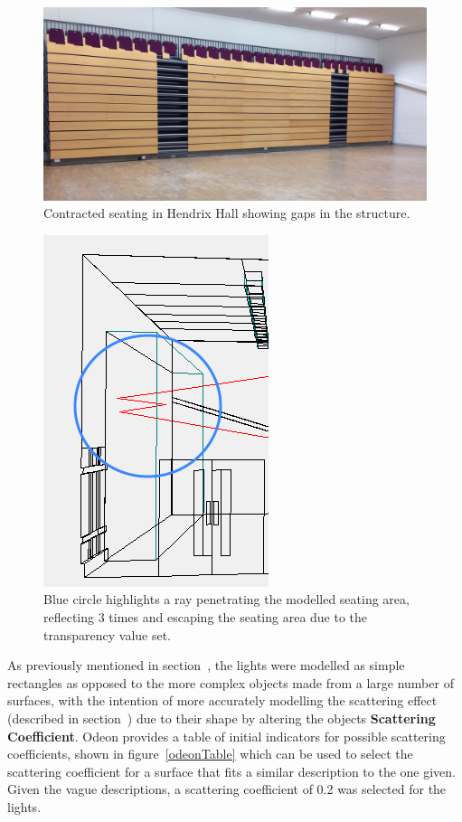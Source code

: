 \documentclass[../../main.tex]{subfiles}
\begin{document}
			\begin{figure}[h]
				\centerline{\includegraphics[width=\textwidth]{Sections/Implementation/Odeon/images/seating.jpg}}
				\caption{Contracted seating in Hendrix Hall showing gaps in the structure.}
				\label{seating}
			\end{figure}

			\begin{figure}
				\center\includegraphics[scale = 0.7]{Sections/Implementation/Odeon/images/OdeonRays/transparencyEdit/singleRay2_edit3.PNG}
				\caption{Blue circle highlights a ray penetrating the modelled seating area, reflecting 3 times and escaping the seating area due to the transparency value set.}
				\label{transparency}
			\end{figure}

			As previously mentioned in section~, the lights were modelled as simple rectangles as opposed to the more complex objects made from a large number of surfaces, with the intention of more accurately modelling the scattering effect (described in section~) due to their shape by altering the objects \textbf{Scattering Coefficient}. Odeon provides a table of initial indicators for possible scattering coefficients, shown in figure~\ref{odeonTable} which can be used to select the scattering coefficient for a surface that fits a similar description to the one given. Given the vague descriptions, a scattering coefficient of 0.2 was selected for the lights.
\end{document}
